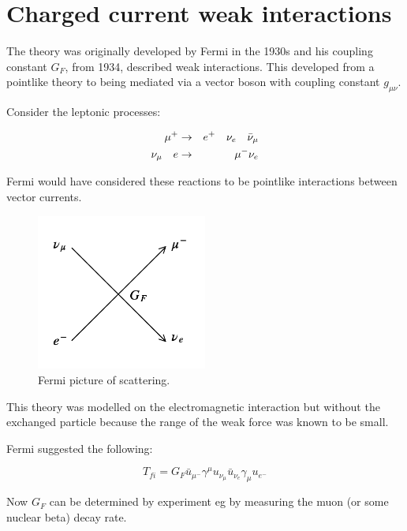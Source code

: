 \chapter{Charged current weak interactions}

The theory was originally developed by Fermi in the 1930s and his coupling constant $G_F$, from 1934, described weak interactions.  This developed from a pointlike theory to being mediated via a vector boson with coupling constant $g_{\mu\nu}$.

Consider the leptonic processes:

\begin{eqnarray*}
  \mu^+ & \to & e^+ \quad \nu_e \quad \bar{\nu}_{\mu} \\
  \nu_{\mu} \quad e & \to & \mu^- \nu_e
\end{eqnarray*}

Fermi would have considered these reactions to be pointlike interactions between vector currents.

\begin{figure}[!htb]
  \begin{center}
    \includegraphics[width=0.5\textwidth]{images/web_feynman/image_42.png}
    \caption[Fermi picture of scattering]{Fermi picture of scattering.}
    \label{fig:ch12_FermiScattering}
  \end{center}
\end{figure}

This theory was modelled on the electromagnetic interaction but without the exchanged particle because the range of the weak force was known to be small.

Fermi suggested the following:

\[
  T_{fi} = G_F\bar{u}_{\mu^-}\gamma^{\mu}u_{\nu_{\mu}}\bar{u}_{\nu_{e}}\gamma_{\mu}u_{e^-}
\]

Now $G_F$ can be determined by experiment eg by measuring the muon (or some nuclear beta) decay rate.

